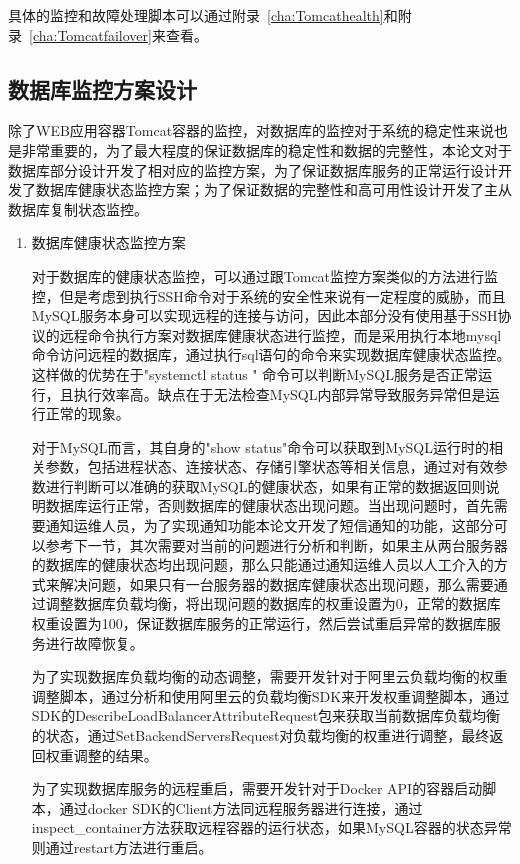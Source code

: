 具体的监控和故障处理脚本可以通过附录~\ref{cha:Tomcathealth}和附录~\ref{cha:Tomcatfailover}来查看。
\subsection{数据库监控方案设计}

除了WEB应用容器Tomcat容器的监控，对数据库的监控对于系统的稳定性来说也是非常重要的，为了最大程度的保证数据库的稳定性和数据的完整性，本论文对于数据库部分设计开发了相对应的监控方案，为了保证数据库服务的正常运行设计开发了数据库健康状态监控方案；为了保证数据的完整性和高可用性设计开发了主从数据库复制状态监控。

\begin{enumerate}
\item 数据库健康状态监控方案

对于数据库的健康状态监控，可以通过跟Tomcat监控方案类似的方法进行监控，但是考虑到执行SSH命令对于系统的安全性来说有一定程度的威胁，而且MySQL服务本身可以实现远程的连接与访问，因此本部分没有使用基于SSH协议的远程命令执行方案对数据库健康状态进行监控，而是采用执行本地mysql命令访问远程的数据库，通过执行sql语句的命令来实现数据库健康状态监控。这样做的优势在于"systemctl status " 命令可以判断MySQL服务是否正常运行，且执行效率高。缺点在于无法检查MySQL内部异常导致服务异常但是运行正常的现象。

对于MySQL而言，其自身的"show status"命令可以获取到MySQL运行时的相关参数，包括进程状态、连接状态、存储引擎状态等相关信息，通过对有效参数进行判断可以准确的获取MySQL的健康状态，如果有正常的数据返回则说明数据库运行正常，否则数据库的健康状态出现问题。当出现问题时，首先需要通知运维人员，为了实现通知功能本论文开发了短信通知的功能，这部分可以参考下一节，其次需要对当前的问题进行分析和判断，如果主从两台服务器的数据库的健康状态均出现问题，那么只能通过通知运维人员以人工介入的方式来解决问题，如果只有一台服务器的数据库健康状态出现问题，那么需要通过调整数据库负载均衡，将出现问题的数据库的权重设置为0，正常的数据库权重设置为100，保证数据库服务的正常运行，然后尝试重启异常的数据库服务进行故障恢复。

为了实现数据库负载均衡的动态调整，需要开发针对于阿里云负载均衡的权重调整脚本，通过分析和使用阿里云的负载均衡SDK来开发权重调整脚本，通过SDK的DescribeLoadBalancerAttributeRequest包来获取当前数据库负载均衡的状态，通过SetBackendServersRequest对负载均衡的权重进行调整，最终返回权重调整的结果。

为了实现数据库服务的远程重启，需要开发针对于Docker API的容器启动脚本，通过docker SDK的Client方法同远程服务器进行连接，通过inspect\_container方法获取远程容器的运行状态，如果MySQL容器的状态异常则通过restart方法进行重启。


\end{enumerate}
